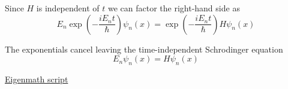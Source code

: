 Since $H$ is independent of $t$ we can factor the right-hand side as
\begin{equation*}
E_n\exp\left(-\frac{iE_nt}{\hbar}\right)\psi_n(x)=\exp\left(-\frac{iE_nt}{\hbar}\right)H\psi_n(x)
\end{equation*}

The exponentials cancel leaving the time-independent Schrodinger equation
\begin{equation*}
E_n\psi_n(x)=H\psi_n(x)
\end{equation*}

\href{https://georgeweigt.github.io/examples/harmonic-oscillator-1-demo.html}{Eigenmath script}


